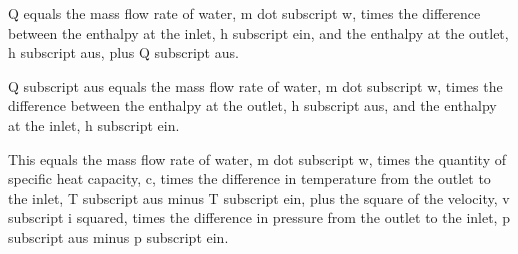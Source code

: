 Q equals the mass flow rate of water, m dot subscript w, times the difference between the enthalpy at the inlet, h subscript ein, and the enthalpy at the outlet, h subscript aus, plus Q subscript aus.

Q subscript aus equals the mass flow rate of water, m dot subscript w, times the difference between the enthalpy at the outlet, h subscript aus, and the enthalpy at the inlet, h subscript ein.

This equals the mass flow rate of water, m dot subscript w, times the quantity of specific heat capacity, c, times the difference in temperature from the outlet to the inlet, T subscript aus minus T subscript ein, plus the square of the velocity, v subscript i squared, times the difference in pressure from the outlet to the inlet, p subscript aus minus p subscript ein.